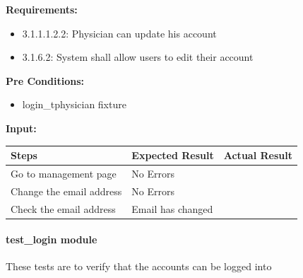 \documentclass[letterpaper,10pt,english]{sphinxmanual}
\begin{document}
\begin{fulllineitems}
\label{STD/test_edit_account:test_edit_account.test_physician_can_edit_his_account}
\textbf{Requirements:}
\begin{itemize}
\item {} 
3.1.1.1.2.2: Physician can update his account

\item {} 
3.1.6.2: System shall allow users to edit their account

\end{itemize}

\textbf{Pre Conditions:}
\begin{itemize}
\item {} 
login\_tphysician fixture

\end{itemize}

\textbf{Input:}

\begin{tabulary}{\linewidth}{|L|L|L|}
\hline
\textsf{\relax 
Steps
} & \textsf{\relax 
Expected Result
} & \textsf{\relax 
Actual Result
}\\
\hline
Go to management page
 & 
No Errors
 & \\
\hline
Change the email address
 & 
No Errors
 & \\
\hline
Check the email address
 & 
Email has changed
 & \\
\hline\end{tabulary}


\end{fulllineitems}



\paragraph{test\_login module}
\label{STD/test_login:test-login-module}\label{STD/test_login:module-test_login}\label{STD/test_login::doc}
These tests are to verify that the accounts can be logged into
\end{document}
